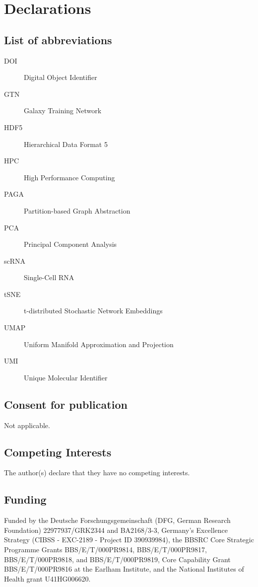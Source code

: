 \documentclass[a4paper,num-refs]{oup-contemporary}
\begin{document}
\section{Declarations}

\subsection{List of abbreviations}

\begin{description}
\item[DOI]{Digital Object Identifier}
\item[GTN]{Galaxy Training Network}
\item[HDF5]{Hierarchical Data Format 5}
\item[HPC]{High Performance Computing}
\item[PAGA]{Partition-based Graph Abstraction}
\item[PCA]{Principal Component Analysis}
\item[scRNA]{Single-Cell RNA}
\item[tSNE]{t-distributed Stochastic Network Embeddings}
\item[UMAP]{Uniform Manifold Approximation and Projection}
\item[UMI]{Unique Molecular Identifier}
\end{description}

\subsection{Consent for publication}

Not applicable.

\subsection{Competing Interests}

The author(s) declare that they have no competing interests.

\subsection{Funding}

Funded by the Deutsche Forschungsgemeinschaft (DFG, German Research Foundation) 22977937/GRK2344 and BA2168/3-3, Germany’s Excellence Strategy (CIBSS - EXC-2189 - Project ID 390939984), the BBSRC Core Strategic Programme Grants BBS/E/T/000PR9814, BBS/E/T/000PR9817, BBS/E/T/000PR9818, and BBS/E/T/000PR9819, Core Capability Grant BBS/E/T/000PR9816 at the Earlham Institute, and the National Institutes of Health grant U41HG006620.
\end{document}
